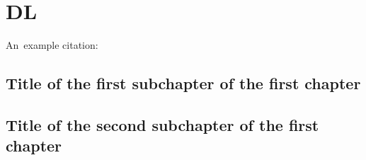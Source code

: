 \chapter{DL}

An~example citation: \cite{Andel07}

\section{Title of the first subchapter of the first chapter}

\section{Title of the second subchapter of the first chapter}
